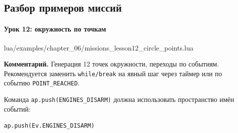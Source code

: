 \subsection{Разбор примеров миссий}
\paragraph{Урок 12: окружность по точкам}
\begin{codefile}{lua/examples/chapter_06/missions_lesson12_circle_points.lua}
\end{codefile}
\textbf{Комментарий.} Генерация 12 точек окружности, переходы по событиям. Рекомендуется заменить \texttt{while/break} на явный шаг через таймер или по событию \texttt{POINT\_REACHED}.

Команда \texttt{ap.push(ENGINES\_DISARM)} должна использовать пространство имён событий:
\begin{center}
\texttt{ap.push(Ev.ENGINES\_DISARM)}
\end{center}

